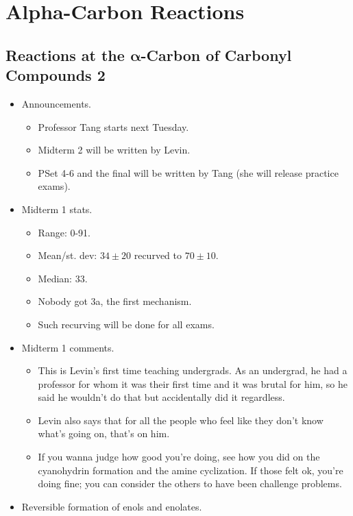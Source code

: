 \documentclass[../notes.tex]{subfiles}
\begin{document}
\chapter{Alpha-Carbon Reactions}
\section[Reactions at the \texorpdfstring{$\alpha$}{TEXT}-Carbon of Carbonyl Compounds 2]{Reactions at the \texorpdfstring{$\bm{\alpha}$}{TEXT}-Carbon of Carbonyl Compounds 2}
\begin{itemize}
    \item {}Announcements.
    \begin{itemize}
        \item Professor Tang starts next Tuesday.
        \item Midterm 2 will be written by Levin.
        \item PSet 4-6 and the final will be written by Tang (she will release practice exams).
    \end{itemize}
    \item Midterm 1 stats.
    \begin{itemize}
        \item Range: 0-91.
        \item Mean/st. dev: $34\pm 20$ recurved to $70\pm 10$.
        \item Median: 33.
        \item Nobody got 3a, the first mechanism.
        \item Such recurving will be done for all exams.
    \end{itemize}
    \item Midterm 1 comments.
    \begin{itemize}
        \item This is Levin's first time teaching undergrads. As an undergrad, he had a professor for whom it was their first time and it was brutal for him, so he said he wouldn't do that but accidentally did it regardless.
        \item Levin also says that for all the people who feel like they don't know what's going on, that's on him.
        \item If you wanna judge how good you're doing, see how you did on the cyanohydrin formation and the amine cyclization. If those felt ok, you're doing fine; you can consider the others to have been challenge problems.
    \end{itemize}
    \item Reversible formation of enols and enolates.

\end{itemize}
\end{document}
